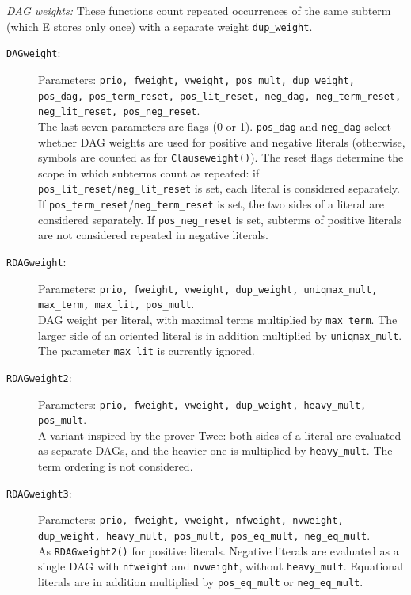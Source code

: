 \documentclass{report}
\begin{document}
\medskip
\noindent\emph{DAG weights:} These functions count repeated
occurrences of the same subterm (which E stores only once) with a
separate weight \texttt{dup\_weight}.

\begin{description}
\item[\texttt{DAGweight}:] Parameters: \texttt{prio, fweight, vweight,
    pos\_mult, dup\_weight, pos\_dag, pos\_term\_reset,
    pos\_lit\_reset, neg\_dag, neg\_term\_reset, neg\_lit\_reset,
    pos\_neg\_reset}.\\
  The last
  seven parameters are flags (0 or 1). \texttt{pos\_dag} and
  \texttt{neg\_dag} select whether DAG weights are used for positive
  and negative literals (otherwise, symbols are counted as for
  \texttt{Clauseweight()}). The reset flags determine the scope in
  which subterms count as repeated: if
  \texttt{pos\_lit\_reset}/\texttt{neg\_lit\_reset} is set, each
  literal is considered separately. If
  \texttt{pos\_term\_reset}/\texttt{neg\_term\_reset} is set, the two
  sides of a literal are considered separately. If
  \texttt{pos\_neg\_reset} is set, subterms of positive literals are
  not considered repeated in negative literals.
\item[\texttt{RDAGweight}:] Parameters: \texttt{prio, fweight,
    vweight, dup\_weight, uniqmax\_mult, max\_term, max\_lit,
    pos\_mult}.\\
  DAG weight per
  literal, with maximal terms multiplied by \texttt{max\_term}. The
  larger side of an oriented literal is in addition multiplied by
  \texttt{uniqmax\_mult}. The parameter \texttt{max\_lit} is
  currently ignored.
\item[\texttt{RDAGweight2}:] Parameters: \texttt{prio, fweight,
    vweight, dup\_weight, heavy\_mult, pos\_mult}.\\
  A variant inspired by the prover
  Twee: both sides of a literal are evaluated as separate DAGs, and
  the heavier one is multiplied by \texttt{heavy\_mult}. The term
  ordering is not considered.
\item[\texttt{RDAGweight3}:] Parameters: \texttt{prio, fweight,
    vweight, nfweight, nvweight, dup\_weight, heavy\_mult, pos\_mult,
    pos\_eq\_mult, neg\_eq\_mult}.\\
  As \texttt{RDAGweight2()} for positive
  literals. Negative literals are evaluated as a single DAG with
  \texttt{nfweight} and \texttt{nvweight}, without
  \texttt{heavy\_mult}. Equational literals are in addition multiplied
  by \texttt{pos\_eq\_mult} or \texttt{neg\_eq\_mult}.
\end{description}
\end{document}
